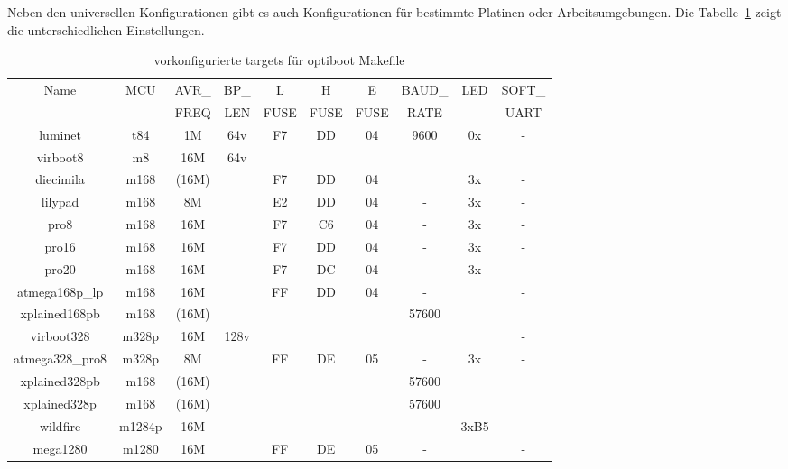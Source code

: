 Neben den universellen Konfigurationen gibt es auch Konfigurationen für bestimmte
Platinen oder Arbeitsumgebungen.
Die Tabelle~\ref{tab:boards} zeigt die unterschiedlichen Einstellungen.

\begin{table}[H]
  \begin{center}
    \begin{tabular}{| c | c | c | c | c | c | c | c | c | c | }
    \hline
             Name  & MCU & AVR\_ & BP\_ & L     & H     & E     & BAUD\_ & LED & SOFT\_ \\
                   &     & FREQ  & LEN  &  FUSE & FUSE  &  FUSE & RATE &     & UART \\
    \hline
    \hline
       luminet     & t84 &  1M   & 64v &  F7   &  DD   &  04   & 9600 & 0x  &  -   \\

    \hline
         virboot8  & m8    & 16M & 64v &       &       &       &      &     &      \\
    \hline
       diecimila  &  m168 & (16M) &     &  F7   &  DD   &  04   &      & 3x  &  -   \\
       lilypad    &  m168  & 8M  &      &  E2   &  DD   &  04   &  -   & 3x  &  -   \\
       pro8       &  m168  & 16M &      &  F7   &  C6   &  04   &  -   & 3x  &  -   \\
       pro16      &  m168  & 16M &      &  F7   &  DD   &  04   &  -   & 3x  &  -   \\
       pro20      &  m168  & 16M &      &  F7   &  DC   &  04   &  -   & 3x  &  -   \\
    atmega168p\_lp&  m168  & 16M &      &  FF   &  DD   &  04   &  -   &     &  -   \\
   xplained168pb  &  m168  &(16M)&      &       &       &      & 57600 &     &      \\
    \hline
       virboot328  & m328p & 16M & 128v &       &       &       &      &     &  -   \\
    atmega328\_pro8& m328p & 8M  &      &  FF   &  DE   &  05   &  -   & 3x  &  -   \\
   xplained328pb  &  m168  &(16M)&      &       &       &      & 57600 &     &      \\
   xplained328p   &  m168  &(16M)&      &       &       &      & 57600 &     &      \\
    \hline
        wildfire  & m1284p & 16M &      &       &       &      &   -   & 3xB5 &      \\
    \hline
       mega1280    & m1280 & 16M &      &  FF   &  DE   &  05   &  -   &     &  -   \\
    \hline
    \end{tabular}
  \end{center}
  \caption{vorkonfigurierte targets für optiboot Makefile}
  \label{tab:boards}
\end{table}

